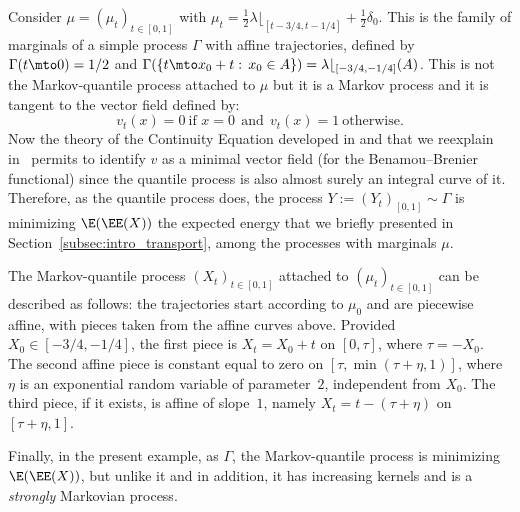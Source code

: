 \begin{ex}\label{ex:strongmarkov}
Consider $\mu=(\mu_t)_{t\in [0,1]}$ with $\mu_t=\frac12 \lambda\lfloor_{[t-3/4,t-1/4]}+\frac12 \delta_{0}$. This is the family of marginals of a simple process $\Gamma$ with affine trajectories, defined by $\Gamma(t\mto 0)=1/2$ and $\Gamma(\{t\mto x_0+t:\,x_0\in A\})=\lambda\lfloor_{[-3/4,-1/4]}(A)$. This is not the Markov-quantile process attached to $\mu$ but it is a Markov process and it is tangent to the vector field defined by:
\[v_t(x)=0\ \text{if }x=0\ \ \text{and}\ \ v_t(x)=1\ \text{otherwise.}\]
Now the theory of the Continuity Equation developed in \cite{AGS} and that we reexplain in~\cite{BouJui2} permits to identify $v$ as a minimal vector field (for the Benamou--Brenier functional) since the quantile process is also almost surely an integral curve of it. Therefore, as the quantile process does, the process $Y:=(Y_t)_{[0,1]}\sim\Gamma$ is minimizing $\E(\EE(X))$ the expected energy that we briefly presented in Section~\ref{subsec:intro_transport}, among the processes with marginals $\mu$.

The Markov-quantile process $(X_t)_{t\in [0,1]}$ attached to $(\mu_t)_{t\in[0,1]}$ can be described as follows: the trajectories start according to $\mu_0$ and are piecewise affine, with pieces taken from the affine curves above. Provided $X_0\in [-3/4,-1/4]$, the first piece is $X_t=X_0+t$ on $[0,\tau]$, where $\tau=-X_0$. The second affine piece is constant equal to zero on $[\tau,\min(\tau+\eta,1)]$, where $\eta$ is an exponential random variable of parameter~$2$, independent from $X_0$. The third piece, if it exists, is affine of slope~$1$, namely $X_t=t-(\tau+\eta)$ on $[\tau+\eta,1]$.

Finally, in the present example, as $\Gamma$, the Markov-quantile process is minimizing $\E(\EE(X))$, but unlike it and in addition, it has increasing kernels and is a \emph{strongly} Markovian process.
\end{ex}

